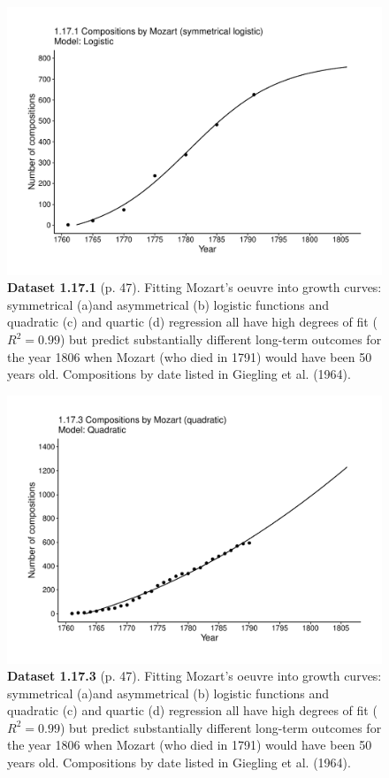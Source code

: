 \documentclass[aps,rmp,preprint,superscriptaddress,10pt,onecolumn]{article}
\begin{document}
\clearpage
\begin{figure}[h]
\includegraphics[width=\textwidth]{output/figs-ggplot/1.17.1.pdf}
\caption*{\textbf{Dataset 1.17.1} (p. 47). Fitting Mozart's oeuvre into growth curves: symmetrical (a)and asymmetrical (b) logistic functions and quadratic (c) and quartic (d) regression all have high degrees of fit ($R^2=0.99$) but predict substantially different long-term outcomes for the year 1806 when Mozart (who died in 1791) would have been 50 years old. Compositions by date listed in Giegling et al. (1964).}
\end{figure}
	
\clearpage
\begin{figure}[h]
\includegraphics[width=\textwidth]{output/figs-ggplot/1.17.3.pdf}
\caption*{\textbf{Dataset 1.17.3} (p. 47). Fitting Mozart's oeuvre into growth curves: symmetrical (a)and asymmetrical (b) logistic functions and quadratic (c) and quartic (d) regression all have high degrees of fit ($R^2=0.99$) but predict substantially different long-term outcomes for the year 1806 when Mozart (who died in 1791) would have been 50 years old. Compositions by date listed in Giegling et al. (1964).}
\end{figure}
	
\end{document}
